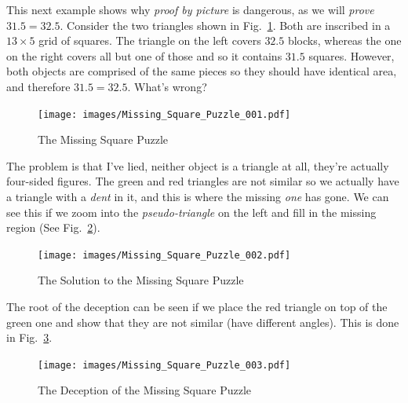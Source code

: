         \begin{example}
            \label{ex:Missing_Square_Puzzle}%
            This next example shows why \textit{proof by picture}%
             is dangerous, as we will \textit{prove}
            $31.5=32.5$. Consider the two triangles shown in
            Fig.~\ref{fig:Missing_Square_Puzzle}. Both are inscribed in a
            $13\times{5}$ grid of squares. The triangle on the left covers
            $32.5$ blocks, whereas the one on the right covers all but one of
            those and so it contains $31.5$ squares. However, both objects are
            comprised of the same pieces so they should have identical area, and
            therefore $31.5=32.5$. What's wrong?
            \begin{figure}
                \centering
                \captionsetup{type=figure}
                \texttt{[image: images/Missing\_Square\_Puzzle\_001.pdf]}
                \caption{The Missing Square Puzzle}
                \label{fig:Missing_Square_Puzzle}
            \end{figure}
            The problem is that I've lied, neither object is a triangle at all,
            they're actually four-sided figures. The green and red triangles are
            not similar so we actually have a triangle with a \textit{dent} in
            it, and this is where the missing \textit{one} has gone. We can see
            this if we zoom into the \textit{pseudo-triangle} on the left and
            fill in the missing region
            (See Fig.~\ref{fig:Missing_Square_Puzzle_Solution}).
            \begin{figure}
                \centering
                \captionsetup{type=figure}
                \texttt{[image: images/Missing\_Square\_Puzzle\_002.pdf]}
                \caption{The Solution to the Missing Square Puzzle}
                \label{fig:Missing_Square_Puzzle_Solution}
            \end{figure}
            The root of the deception can be seen if we place the red triangle
            on top of the green one and show that they are not similar (have
            different angles). This is done in
            Fig.~\ref{fig:Missing_Square_Puzzle_Deception}.
        \end{example}
        \begin{figure}
            \centering
            \captionsetup{type=figure}
            \texttt{[image: images/Missing\_Square\_Puzzle\_003.pdf]}
            \caption{The Deception of the Missing Square Puzzle}
            \label{fig:Missing_Square_Puzzle_Deception}
        \end{figure}
